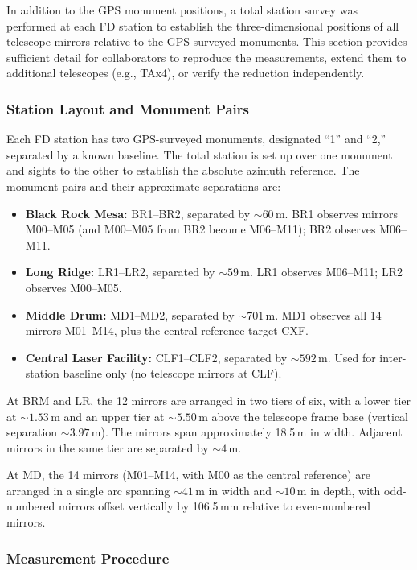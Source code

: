 \documentclass[11pt,letterpaper]{article}
\begin{document}
In addition to the GPS monument positions, a total station survey was performed at each FD station to establish the three-dimensional positions of all telescope mirrors relative to the GPS-surveyed monuments. This section provides sufficient detail for collaborators to reproduce the measurements, extend them to additional telescopes (e.g., TAx4), or verify the reduction independently.

\subsubsection{Station Layout and Monument Pairs}

Each FD station has two GPS-surveyed monuments, designated ``1'' and ``2,'' separated by a known baseline. The total station is set up over one monument and sights to the other to establish the absolute azimuth reference. The monument pairs and their approximate separations are:

\begin{itemize}[nosep]
    \item \textbf{Black Rock Mesa:} BR1--BR2, separated by $\sim\!60$\,m. BR1 observes mirrors M00--M05 (and M00--M05 from BR2 become M06--M11); BR2 observes M06--M11.
    \item \textbf{Long Ridge:} LR1--LR2, separated by $\sim\!59$\,m. LR1 observes M06--M11; LR2 observes M00--M05.
    \item \textbf{Middle Drum:} MD1--MD2, separated by $\sim\!701$\,m. MD1 observes all 14 mirrors M01--M14, plus the central reference target CXF.
    \item \textbf{Central Laser Facility:} CLF1--CLF2, separated by $\sim\!592$\,m. Used for inter-station baseline only (no telescope mirrors at CLF).
\end{itemize}

At BRM and LR, the 12 mirrors are arranged in two tiers of six, with a lower tier at $\sim\!1.53$\,m and an upper tier at $\sim\!5.50$\,m above the telescope frame base (vertical separation $\sim\!3.97$\,m). The mirrors span approximately 18.5\,m in width. Adjacent mirrors in the same tier are separated by $\sim\!4$\,m.

At MD, the 14 mirrors (M01--M14, with M00 as the central reference) are arranged in a single arc spanning $\sim\!41$\,m in width and $\sim\!10$\,m in depth, with odd-numbered mirrors offset vertically by 106.5\,mm relative to even-numbered mirrors.

\subsubsection{Measurement Procedure}
\end{document}

